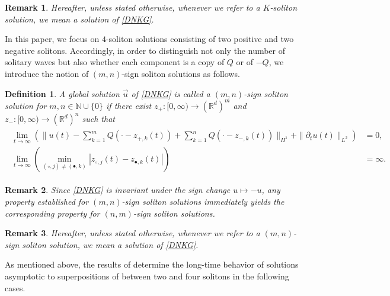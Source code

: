 \documentclass[10pt,a4paper]{amsart}
\newtheorem{definition}{Definition}[section]
\newtheorem{remark}{Remark}[section]
\numberwithin{equation}{section}
\begin{document}
\begin{remark}
Hereafter, unless stated otherwise, whenever we refer to a $K$-soliton solution, we mean a solution of \eqref{DNKG}.
\end{remark}

In this paper, we focus on $4$-soliton solutions consisting of two positive and two negative solitons. Accordingly, in order to distinguish not only the number of solitary waves but also whether each component is a copy of $Q$ or of $-Q$, we introduce the notion of $(m,n)$-sign soliton solutions as follows.
\begin{definition}\label{defm,nsoli}
A global solution $\vec{u}$ of \eqref{DNKG} is called a \textit{$(m,n)$-sign soliton solution} for $m,n\in\mathbb{N}\cup\{0\}$ if there exist $z_+:[0,\infty)\to (\mathbb{R}^d)^m$ and $z_-:[0,\infty)\to(\mathbb{R}^d)^n$ such that 
\begin{align}
\label{mnsoli}
\begin{aligned}
\lim_{t\to \infty} \left(\|u(t)-\sum_{k=1}^mQ(\cdot-z_{+,k}(t))+\sum_{k=1}^n Q(\cdot-z_{-,k}(t))\|_{H^1}+\|{\partial}_tu(t)\|_{L^2}\right)&=0,
\\
\lim_{t\to\infty}\left( \min_{(\circ,j)\neq (\bullet,k)}|z_{\circ,j}(t)-z_{\bullet,k}(t)|\right)&=\infty.
\end{aligned}
\end{align}
\end{definition}


\begin{remark}
Since \eqref{DNKG} is invariant under the sign change $u\mapsto -u$, any property established for $(m,n)$-sign soliton  solutions immediately yields the corresponding property for $(n,m)$-sign soliton solutions.
\end{remark}
\begin{remark}
Hereafter, unless stated otherwise, whenever we refer to a $(m,n)$-sign soliton solution, we mean a solution of \eqref{DNKG}.
\end{remark}

As mentioned above, the results of \cite{CD,CMYZ,I2,I3} determine the long-time behavior of solutions asymptotic to superpositions of between two and four solitons in the following cases.
\end{document}
